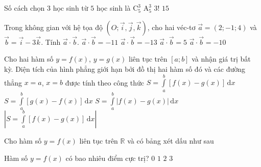 \begin{ex}%
	Số cách chọn $3$ học sinh từ $5$ học sinh là
	\choice
	{\True $\mathrm{C}_5^3$}
	{$\mathrm{A}_5^3$}
	{$3!$}
	{$15$}
\end{ex}
\begin{ex}%
	Trong không gian với hệ tọa độ $\left(O;\overrightarrow{i},\overrightarrow{j},\overrightarrow{k}\right)$, cho hai véc-tơ $\overrightarrow{a}=(2;-1;4)$ và $\overrightarrow{b}=\overrightarrow{i}-3\overrightarrow{k}$. Tính $\overrightarrow{a}\cdot \overrightarrow{b}$.
	\choice
	{$\overrightarrow{a}\cdot \overrightarrow{b}=-11$}
	{$\overrightarrow{a}\cdot \overrightarrow{b}=-13$}
	{$\overrightarrow{a}\cdot \overrightarrow{b}=5$}
	{\True $\overrightarrow{a}\cdot \overrightarrow{b}=-10$}
\end{ex}
\begin{ex}%
	Cho hai hàm số $y=f(x)$, $y=g(x)$ liên tục trên $\left[a;b\right]$ và nhận giá trị bất kỳ. Diện tích của hình phẳng giới hạn bởi đồ thị hai hàm số đó và các đường thẳng $x=a$, $x=b$ được tính theo công thức
	\choice
	{$S=\displaystyle \int \limits_a^b \left[f(x)-g(x)\right] \mathrm{\,d}x$}
	{$S=\displaystyle \int \limits_a^b \left[g(x)-f(x)\right] \mathrm{\,d}x$}
	{\True $S=\displaystyle \int \limits_a^b \left|f(x)-g(x)\right| \mathrm{\,d}x$}
	{$\left|S=\displaystyle \int \limits_a^b \left[f(x)-g(x)\right] \mathrm{\,d}x\right|$}
\end{ex}
\begin{ex}%
	Cho hàm số $y=f(x)$ liên tục trên $\mathbb{R}$ và có bảng xét dấu như sau
	\begin{center}
	\end{center}
	Hàm số $y=f(x)$ có bao nhiêu điểm cực trị?
	\choice
	{$0$}
	{$1$}
	{\True $2$}
	{$3$}
\end{ex}

